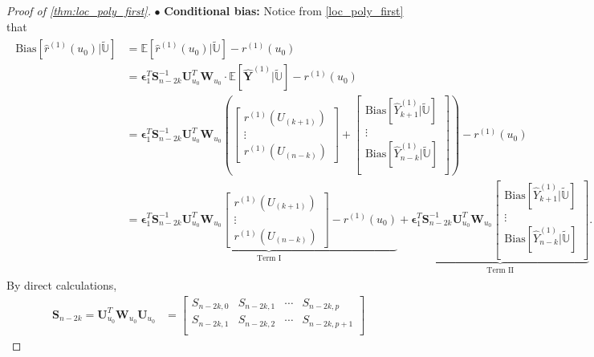 \documentclass{uwstat572}
\theoremstyle{definition}
\renewcommand{\hat}{\widehat}
\renewcommand{\tilde}{\widetilde}
\theoremstyle{theorem}
\begin{document}
\begin{proof}[Proof of \autoref{thm:loc_poly_first}]
$\bullet$ {\bf Conditional bias:} Notice from \eqref{loc_poly_first} that
\begin{align}
\label{cond_bias_loc_poly}
\begin{split}
\mathrm{Bias}\left[\hat{r}^{(1)}(u_0) \big| \tilde{\mathbb{U}}\right] &= \mathbb{E}\left[\hat{r}^{(1)}(u_0) \big| \tilde{\mathbb{U}}\right] - r^{(1)}(u_0)\\
&= \bm{\epsilon}_1^T \bm{S}_{n-2k}^{-1} \bm{U}_{u_0}^T \bm{W}_{u_0} \cdot \mathbb{E}\left[\hat{\bm{Y}}^{(1)} \big| \tilde{\mathbb{U}}\right] - r^{(1)}(u_0)\\
&= \bm{\epsilon}_1^T \bm{S}_{n-2k}^{-1} \bm{U}_{u_0}^T \bm{W}_{u_0} \left(\begin{bmatrix}
r^{(1)}(U_{(k+1)})\\
\vdots\\
r^{(1)}(U_{(n-k)})
\end{bmatrix} + \begin{bmatrix}
\mathrm{Bias}\left[\hat{Y}_{k+1}^{(1)} \big|\tilde{\mathbb{U}}\right]\\
\vdots\\
\mathrm{Bias}\left[\hat{Y}_{n-k}^{(1)} \big|\tilde{\mathbb{U}}\right]\\
\end{bmatrix}\right) -r^{(1)}(u_0)\\
&= \underbrace{\bm{\epsilon}_1^T \bm{S}_{n-2k}^{-1} \bm{U}_{u_0}^T \bm{W}_{u_0} \begin{bmatrix}
	r^{(1)}(U_{(k+1)})\\
	\vdots\\
	r^{(1)}(U_{(n-k)})
\end{bmatrix} -r^{(1)}(u_0)}_{\text{Term I}} + \underbrace{\bm{\epsilon}_1^T \bm{S}_{n-2k}^{-1} \bm{U}_{u_0}^T \bm{W}_{u_0}\begin{bmatrix}
\mathrm{Bias}\left[\hat{Y}_{k+1}^{(1)} \big|\tilde{\mathbb{U}}\right]\\
\vdots\\
\mathrm{Bias}\left[\hat{Y}_{n-k}^{(1)} \big|\tilde{\mathbb{U}}\right]\\
\end{bmatrix}}_{\text{Term II}}.
\end{split}
\end{align}
By direct calculations, 
\begin{align*}
\bm{S}_{n-2k} = \bm{U}_{u_0}^T \bm{W}_{u_0}\bm{U}_{u_0} &= 
\begin{bmatrix}
S_{n-2k,0} & S_{n-2k,1} & \cdots & S_{n-2k,p}\\
S_{n-2k,1} & S_{n-2k,2} & \cdots & S_{n-2k,p+1}\\

\end{bmatrix}
\end{align*}
\end{proof}
\end{document}
